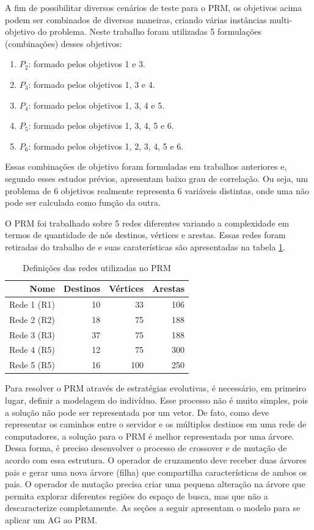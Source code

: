 A fim de possibilitar diversos cenários de teste para o PRM, os objetivos acima podem ser combinados de diversas maneiras, criando várias instâncias multi-objetivo do problema. Neste trabalho foram utilizadas 5 formulações (combinações) desses objetivos:

\begin{enumerate}
	\item $P_2$: formado pelos objetivos 1 e 3.
	\item $P_3$: formado pelos objetivos 1, 3 e 4.
	\item $P_4$: formado pelos objetivos 1, 3, 4 e 5.
	\item $P_5$: formado pelos objetivos 1, 3, 4, 5 e 6.
	\item $P_6$: formado pelos objetivos 1, 2, 3, 4, 5 e 6.
\end{enumerate}

Essas combinações de objetivo foram formuladas em trabalhos anteriores \cite{LafetaThesis,BuenoThesis} e, segundo esses estudos prévios, apresentam baixo grau de correlação. Ou seja, um problema de 6 objetivos realmente representa 6 variáveis distintas, onde uma não pode ser calculada como função da outra.

O PRM foi trabalhado sobre 5 redes diferentes variando a complexidade em termos de quantidade de nós destinos, vértices e arestas. Essas redes foram retiradas do trabalho de \cite{Lafeta2016} e suas caraterísticas são apresentadas na tabela \ref{tab_prm_redes}.

\begin{table}[!htbp]
	\centering
	\caption{Definições das redes utilizadas no PRM}
	\label{tab_prm_redes}
	\begin{tabular}{r|rrr}
		Nome        & Destinos & Vértices & Arestas \\ \hline
		Rede 1 (R1) & 10       & 33       & 106     \\
		Rede 2 (R2) & 18       & 75       & 188     \\
		Rede 3 (R3) & 37       & 75       & 188     \\
		Rede 4 (R5) & 12       & 75       & 300     \\
		Rede 5 (R5) & 16       & 100      & 250     \\ \hline
	\end{tabular}
\end{table}

Para resolver o PRM através de estratégias evolutivas, é necessário, em primeiro lugar, definir a modelagem do indivíduo. Esse processo não é muito simples, pois a solução não pode ser representada por um vetor. De fato, como deve representar os caminhos entre o servidor e os múltiplos destinos em uma rede de computadores, a solução para o PRM é melhor representada por uma árvore. Dessa forma, é preciso desenvolver o processo de crossover e de mutação de acordo com essa estrutura. O operador de cruzamento deve receber duas árvores pais e gerar uma nova árvore (filha) que compartilha características de ambos os pais. O operador de mutação precisa criar uma pequena alteração na árvore que permita explorar diferentes regiões do espaço de busca, mas que não a descaracterize completamente. As seções a seguir apresentam o modelo para se aplicar um AG ao PRM.


